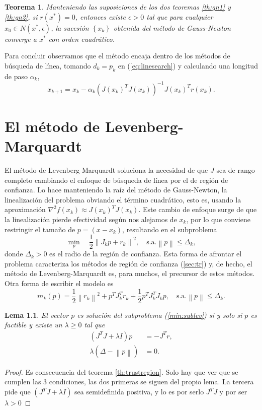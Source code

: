 \documentclass[11pt,a4paper]{book}
\newtheorem{theorem}{Teorema}[chapter]
\newtheorem{lemma}[theorem]{Lema}
\theoremstyle{definition}
\theoremstyle{remark}
\newcommand{\norm}[1]{\left\lVert#1\right\rVert}
\newcommand{\sucesionxk}{\left\{x_k\right\}}
\begin{document}
\begin{theorem}
	Manteniendo las suposiciones de los dos teoremas \ref{th:gn1} y \ref{th:gn2}, si $r(x^*)=0$, entonces existe $\epsilon>0$ tal que para cualquier $x_0 \in N(x^*,\epsilon)$, la sucesión $\sucesionxk$ obtenida del método de Gauss-Newton converge a $x^*$ con orden cuadrático.
\end{theorem}

Para concluir observamos que el método encaja dentro de los métodos de búsqueda de línea, tomando $d_k=p_k$ en  (\ref{eq:linesearch}) y calculando una longitud de paso $\alpha_k$,
\begin{equation}
	x_{k+1} = x_k-\alpha_k(J(x_k)^TJ(x_k))^{-1}J(x_k)^Tr(x_k).
\end{equation}

\chapter{El método de Levenberg-Marquardt}

El método de Levenberg-Marquardt soluciona la necesidad de que $J$ sea de rango completo cambiando el enfoque de búsqueda de línea por el de región de confianza.
Lo hace manteniendo la raíz del método de Gauss-Newton, la linealización del problema obviando el término cuadrático, esto es, usando la aproximación $\nabla^2 f(x_k) \approx J(x_k)^TJ(x_k)$.
Este cambio de enfoque surge de que la linealización pierde efectividad según nos alejamos de $x_k$, por lo que conviene restringir el tamaño de $p=(x-x_k)$, resultando en el subproblema
\begin{equation}
\label{min:sublev}
	\min_{p} \quad \frac{1}{2} \norm{J_kp+r_k}^2,\quad \text{s.a.} \norm{p} \leq \Delta_k,
\end{equation}
donde $\Delta_k>0$ es el radio de la región de confianza.
Esta forma de afrontar el problema caracteriza los métodos de región de confianza (\ref{sec:tr}) y,
de hecho, el método de Levenberg-Marquardt es, para muchos, el precursor de estos métodos. Otra forma de escribir el modelo es
\begin{equation}
	m_k(p)=\frac{1}{2}\norm{r_k}^2 + p^TJ_k^Tr_k + \frac{1}{2}p^TJ_k^TJ_kp,
	\quad \text{s.a.} \norm{p} \leq \Delta_k.
\end{equation}

\begin{lemma}
El vector $p$ es solución del subproblema (\ref{min:sublev}) si y solo si $p$ es factible y existe un $\lambda \geq 0$ tal que
\begin{align}
	(J^TJ+\lambda I)p&=-J^Tr, \label{eq:lmsol}\\
	\lambda (\Delta-\norm{p})&=0.
\end{align}
\end{lemma}
\begin{proof}
Es consecuencia del teorema \ref{th:trustregion}. Solo hay que ver que se cumplen las 3 condiciones, las dos primeras se siguen del propio lema. La tercera pide que $(J^TJ+\lambda I)$ sea semidefinida positiva, y lo es por serlo $J^TJ$ y por ser $\lambda>0$
\end{proof}
\end{document}
